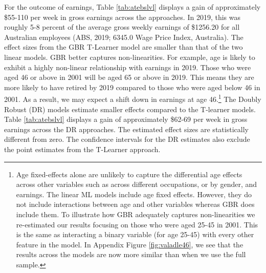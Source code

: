 \documentclass[12pt, a4paper]{article}
\begin{document}
For the outcome of earnings, Table \ref{tab:atebslvl} displays a gain of
approximately \$55-110 per week in gross earnings across the approaches. In
2019, this was roughly 5-8 percent of the average gross weekly earnings of
\$1256.20 for all Australian employees (ABS, 2019; 6345.0 Wage Price Index,
Australia). The effect sizes from the GBR T-Learner model are smaller than that
of the two linear models. GBR better captures non-linearities. For example, age
is likely to exhibit a highly non-linear relationship with earnings in 2019.
Those who were aged 46 or above in 2001 will be aged 65 or above in 2019. This
means they are more likely to have retired by 2019 compared to those who were
aged below 46 in 2001. As a result, we may expect a shift down in earnings at
age 46.\footnote{Age fixed-effects alone are unlikely to capture the
differential age effects across other variables such as across different
occupations, or by gender, and earnings. The linear ML models include age fixed
effects. However, they do not include interactions between age and other
variables whereas GBR does include them. To illustrate how GBR adequately
captures non-linearities we re-estimated our results focusing on those who were
aged 25-45 in 2001. This is the same as interacting a binary variable (for age
25-45) with every other feature in the model. In Appendix Figure
\ref{fig:valadle46}, we see that the results across the models are now more
similar than when we use the full sample.} The Doubly Robust (DR) models
estimate smaller effects compared to the T-learner models. Table
\ref{tab:atebslvl} displays a gain of approximately \$62-69 per week in gross
earnings across the DR approaches. The estimated effect sizes are statistically
different from zero. The confidence intervals for the DR estimates also exclude
the point estimates from the T-Learner approach.
\end{document}
